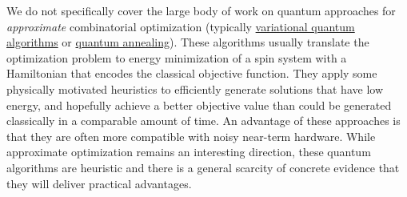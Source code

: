 \begin{refsection}
We do not specifically cover the large body of work on quantum approaches for \emph{approximate} combinatorial optimization (typically \hyperref[prim:VQA]{variational quantum algorithms} or \hyperref[prim:QuantumAdiabaticAlgorithm]{quantum annealing}). These algorithms usually translate the optimization problem to energy minimization of a spin system with a Hamiltonian that encodes the classical objective function. They apply some physically motivated heuristics to efficiently generate solutions that have low energy, and hopefully achieve a better objective value than could be generated classically in a comparable amount of time. An advantage of these approaches is that they are often more compatible with noisy near-term hardware. While approximate optimization remains an interesting direction, these quantum algorithms are heuristic and there is a general scarcity of concrete evidence that they will deliver practical advantages.


\localtableofcontents
	\printbibliography[heading=secbib,segment=\therefsegment]
\end{refsection}
\newpage

